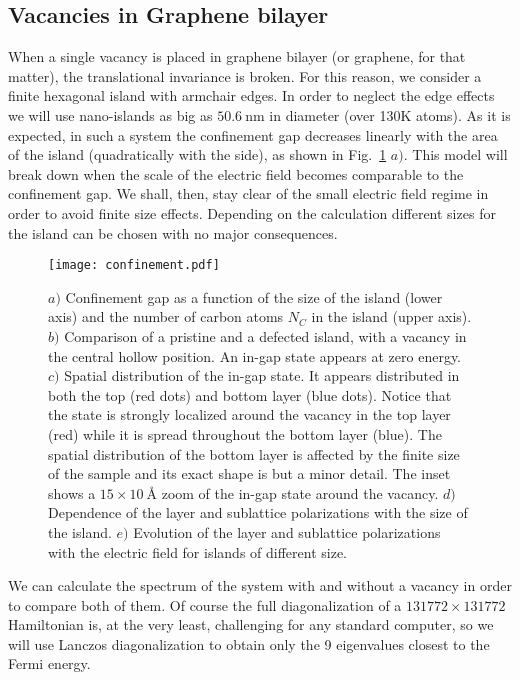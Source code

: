 \documentclass[a4paper]{article}
\begin{document}
\subsection{Vacancies in Graphene bilayer}
When a single vacancy is placed in graphene bilayer (or graphene, for that matter), the translational invariance is broken. For this reason, we consider a finite hexagonal island with armchair edges. In order to neglect the edge effects we will use nano-islands as big as $\SI{50.6}{\nm}$ in diameter (over 130K atoms). %
As it is expected, in such a system the confinement gap decreases linearly with the area of the island (quadratically with the side), as shown in Fig.~\ref{confinement} $a)$. This model will break down when the scale of the electric field becomes comparable to the confinement gap. We shall, then, stay clear of the small electric field regime in order to avoid finite size effects. Depending on the calculation different sizes for the island can be chosen with no major consequences.
\begin{figure}[!ht!]
\centering
\texttt{[image: confinement.pdf]}
\vspace{-20pt}
\caption{$a)$ Confinement gap as a function of the size of the island (lower axis) and the number of carbon atoms $N_C$ in the island (upper axis). $b)$ Comparison of a pristine and a defected island, with a vacancy in the central hollow position. An in-gap state appears at zero energy. $c)$ Spatial distribution of the in-gap state. It appears distributed in both the top (red dots) and bottom layer (blue dots). Notice that the state is strongly localized around the vacancy in the top layer (red) while it is spread throughout the bottom layer (blue). The spatial distribution of the bottom layer is affected by the finite size of the sample and its exact shape is but a minor detail. The inset shows a $15\times\SI{10}{\angstrom}$ zoom of the in-gap state around the vacancy. $d)$ Dependence of the layer and sublattice polarizations with the size of the island. $e)$ Evolution of the layer and sublattice polarizations with the electric field for islands of different size.}
\label{confinement}
\end{figure}

We can calculate the spectrum of the system with and without a vacancy in order to compare both of them. Of course the full diagonalization of a $131772\times131772$ Hamiltonian is, at the very least, challenging for any standard computer, so we will use Lanczos diagonalization\cite{Lanczos1950, Ojalvo1970, Arnoldi1951} to obtain only the 9 eigenvalues closest to the Fermi energy.
\end{document}
